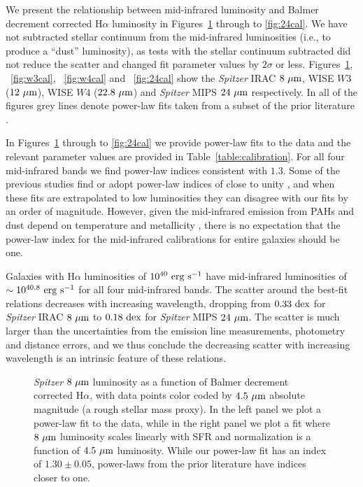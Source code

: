 \documentclass[preprint]{aastex61}
\begin{document}
We present the relationship between mid-infrared luminosity and Balmer decrement corrected H$\alpha$ luminosity in Figures~\ref{fig:I4cal} through to \ref{fig:24cal}. We have not subtracted stellar continuum from the mid-infrared luminosities (i.e., to produce a ``dust'' luminosity), as tests with the stellar continuum subtracted did not reduce the scatter and changed fit parameter values by $2\sigma$ or less. Figures~\ref{fig:I4cal}, ~\ref{fig:w3cal},  ~\ref{fig:w4cal} and ~\ref{fig:24cal} show the {\it Spitzer} IRAC $8~{\rm \mu m}$, WISE $W3$ ($12~{\rm \mu m}$), WISE $W4$ ($22.8~{\rm \mu m}$) and {\it Spitzer} MIPS $24~{\rm \mu m}$ respectively. In all of the figures grey lines denote power-law fits taken from a subset of the prior literature \citep{wu05,rel07,zhu08,ken09,jar13,lee13,clu14,cat15,dav16}. 

In Figures~\ref{fig:I4cal} through to \ref{fig:24cal} we provide power-law fits to the data and the relevant parameter values are provided in Table~\ref{table:calibration}. For all four mid-infrared bands we find power-law indices consistent with $1.3$. Some of the previous studies find or adopt power-law indices of close to unity \citep[i.e.,][]{cal07,ken09,jar13,lee13}, and when these fits are extrapolated to low luminosities they can disagree with our fits by an order of magnitude. However, given the mid-infrared emission from PAHs and dust depend on temperature and metallicity \citep[e.g.,][]{eng05,wu06,dra07,eng08,smi07,cal07}, there is no expectation that the power-law index for the mid-infrared calibrations for entire galaxies should be one.

Galaxies with H$\alpha$ luminosities of $10^{40}~{\rm erg~s^{-1}}$ have mid-infrared luminosities of $\sim 10^{40.8}~{\rm erg~s^{-1}}$ for all four mid-infrared bands. The scatter around the best-fit relations decreases with increasing wavelength, dropping from $0.33~{\rm dex}$ for {\it Spitzer} IRAC $8~{\rm \mu m}$ to $0.18~{\rm dex}$ for {\it Spitzer} MIPS $24~{\rm \mu m}$. The scatter is much larger than the uncertainties from the emission line measurements, photometry and distance errors, and we thus conclude the decreasing scatter with increasing wavelength is an intrinsic feature of these relations. 

\begin{figure*}
\caption{{\it Spitzer} $8~{\rm \mu m}$ luminosity as a function of Balmer decrement corrected H$\alpha$, with data points color coded by $4.5~{\rm \mu m}$ absolute magnitude (a rough stellar mass proxy). In the left panel we plot a power-law fit to the data, while in the right panel we plot a fit where $8~{\rm \mu m}$ luminosity scales linearly with SFR and normalization is a function of $4.5~{\rm \mu m}$ luminosity. While our power-law fit has an index of $1.30\pm 0.05$, power-laws from the prior literature have indices closer to one.}
\label{fig:I4cal}
\end{figure*}
\end{document}
